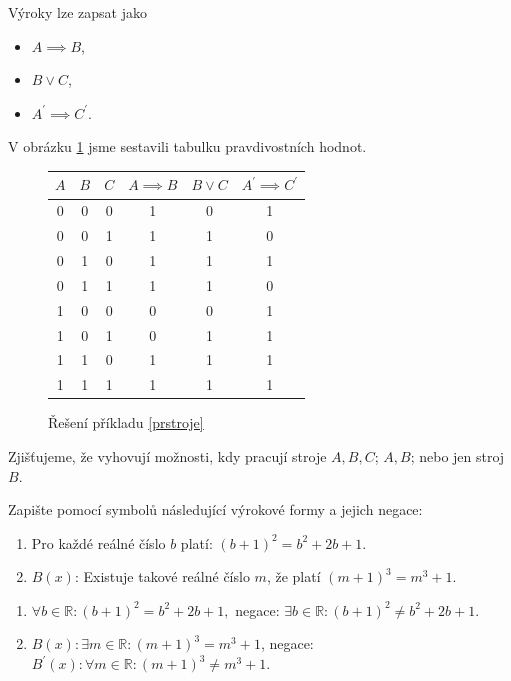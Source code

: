 \begin{reseni}
    Výroky lze zapsat jako
    \begin{itemize}
    \item $A\implies B$,
   	\item $B\lor C$,
   	\item $A^\prime \implies C^\prime$.
    \end{itemize}
    V obrázku \ref{tabulkaprstroje} jsme sestavili tabulku pravdivostních hodnot.
    \begin{figure}[h]
	\centering
	\begin{tabular}{c c c | c c c }
        $A$ & $B$ & $C$ & $A \implies B$ & $B \lor C$ & $A^\prime \implies C^\prime$ \\
        \hline
        0 & 0 & 0 & 1 & 0 & 1  \\
        0 & 0 & 1 & 1 & 1 & 0  \\
        0 & 1 & 0 & 1 & 1 & 1  \\
        0 & 1 & 1 & 1 & 1 & 0  \\
        1 & 0 & 0 & 0 & 0 & 1  \\
        1 & 0 & 1 & 0 & 1 & 1  \\
        1 & 1 & 0 & 1 & 1 & 1  \\
        1 & 1 & 1 & 1 & 1 & 1  \\
      \end{tabular}
	\caption{Řešení příkladu \ref{prstroje}}
	\label{tabulkaprstroje}
    \end{figure}
    Zjišťujeme, že vyhovují možnosti, kdy pracují
    stroje $A,B,C$; $A,B$; nebo jen stroj $B.$
\end{reseni}

\begin{priklad}
    Zapište pomocí symbolů následující výrokové formy a jejich negace:
    \begin{enumerate}[$a.$]
    \item Pro každé reálné číslo $b$ platí: $(b+1)^2=b^2+2b+1.$
   	\item $B(x)$: Existuje takové reálné číslo $m$, že platí $(m+1)^3=m^3+1$.
    \end{enumerate}
\end{priklad}

\begin{reseni}
\begin{enumerate}[$a.$]
\item $\forall b \in \mathbb R\colon (b+1)^2=b^2+2b+1,$ negace: $\exists b \in \mathbb R\colon  (b+1)^2\ne b^2+2b+1.$
\item $B(x)\colon \exists m \in \mathbb R\colon (m+1)^3=m^3+1$, negace: $B^\prime(x): \forall m \in \mathbb R\colon (m+1)^3\ne m^3+1.$
\end{enumerate}
\end{reseni}

